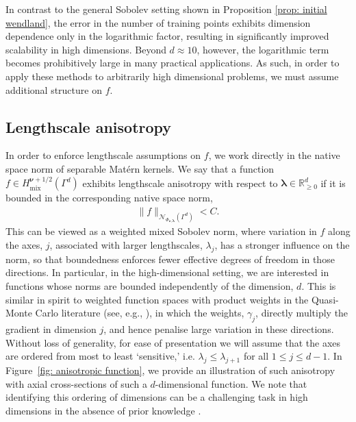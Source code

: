 \documentclass[pdflatex,sn-mathphys-num]{sn-jnl}%
\theoremstyle{thmstyleone}%
\theoremstyle{thmstyletwo}%
\theoremstyle{thmstylethree}%
\begin{document}
In contrast to the general Sobolev setting shown in Proposition \ref{prop: initial wendland}, the error in the number of training points exhibits dimension dependence only in the logarithmic factor, resulting in significantly improved scalability in high dimensions. Beyond \(d\approx10\), however, the logarithmic term becomes prohibitively large in many practical applications. As such, in order to apply these methods to arbitrarily high dimensional problems, we must assume additional structure on \(f\).


\subsection{Lengthscale anisotropy}\label{subsec: lengthscale anisotropy}
In order to enforce lengthscale assumptions on \(f\), we work directly in the native space norm of separable Mat\'ern kernels. We say that a function \(f\in H^{\boldsymbol{\nu}+1/2}_{\textrm{mix}}(\Gamma^d)\) exhibits lengthscale anisotropy with respect to \(\boldsymbol{\lambda}\in\mathbb{R}_{\geq0}^d\) if it is bounded in the corresponding native space norm,
\begin{align}
    \|f\|_{\mathcal{N}_{\Phi_{\boldsymbol{\nu},\boldsymbol{\lambda}}}(\Gamma^d)}<C.\label{eq: anisotropic condition}
\end{align}
This can be viewed as a weighted mixed Sobolev norm, where variation in \(f\) along the axes, \(j\), associated with larger lengthscales, \(\lambda_j\), has a stronger influence on the norm, so that boundedness enforces fewer effective degrees of freedom in those directions. In particular, in the high-dimensional setting, we are interested in functions whose norms are bounded independently of the dimension, \(d\). This is similar in spirit to weighted function spaces with product weights in the Quasi-Monte Carlo literature (see, e.g., \cite{sloan1998quasi,dick2013high}), in which the weights, \(\gamma_j\), directly multiply the gradient in dimension \(j\), and hence penalise large variation in these directions. Without loss of generality, for ease of presentation we will assume that the axes are ordered from most to least `sensitive,' i.e. \(\lambda_j\leq\lambda_{j+1}\) for all \(1\leq j\leq d-1\). In Figure~\ref{fig: anisotropic function}, we provide an illustration of such anisotropy with axial cross-sections of such a \(d\)-dimensional function. We note that identifying this ordering of dimensions can be a challenging task in high dimensions in the absence of prior knowledge \cite{Iooss2015}. 
\end{document}

